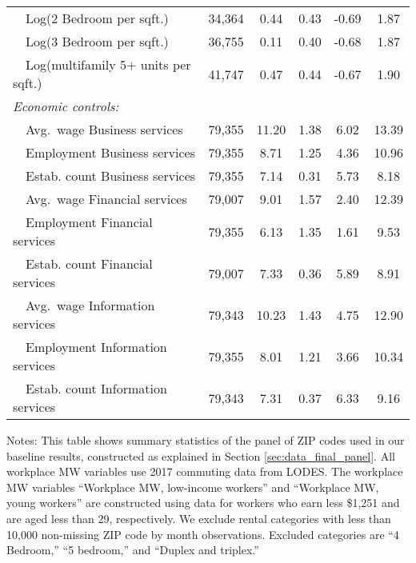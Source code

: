 \begin{table}[hbt!]
\begin{tabular}{@{}lccccc@{}}
        $\quad$Log(2 Bedroom per sqft.)               & 34,364  & 0.44  & 0.43  & -0.69  & 1.87  \\
        $\quad$Log(3 Bedroom per sqft.)               & 36,755  & 0.11  & 0.40  & -0.68  & 1.87  \\
        $\quad$Log(multifamily 5+ units per sqft.)    & 41,747  & 0.47  & 0.44  & -0.67  & 1.90  \\[.3em]
        \textit{Economic controls:}                   &       &       &       &       &       \\
        $\quad$Avg.\ wage Business services           & 79,355  & 11.20  & 1.38  & 6.02  & 13.39  \\
        $\quad$Employment Business services           & 79,355  & 8.71  & 1.25  & 4.36  & 10.96  \\
        $\quad$Estab. count Business services         & 79,355  & 7.14  & 0.31  & 5.73  & 8.18  \\
        $\quad$Avg.\ wage Financial services          & 79,007  & 9.01  & 1.57  & 2.40  & 12.39  \\
        $\quad$Employment Financial services          & 79,355  & 6.13  & 1.35  & 1.61  & 9.53  \\
        $\quad$Estab. count Financial services        & 79,007  & 7.33  & 0.36  & 5.89  & 8.91  \\
        $\quad$Avg.\ wage Information services        & 79,343  & 10.23  & 1.43  & 4.75  & 12.90  \\
        $\quad$Employment Information services        & 79,355  & 8.01  & 1.21  & 3.66  & 10.34  \\
        $\quad$Estab. count Information services      & 79,343  & 7.31  & 0.37  & 6.33  & 9.16  \\ \bottomrule
    \end{tabular}

    \begin{minipage}{.95\textwidth} \footnotesize
        \vspace{2mm}
        Notes: This table shows summary statistics of the panel of ZIP codes 
        used in our baseline results, constructed as explained in Section 
        \ref{sec:data_final_panel}.
        All workplace MW variables use 2017 commuting data from LODES.
        The workplace MW variables ``Workplace MW, low-income workers'' and 
        ``Workplace MW, young workers'' are constructed using data for 
        workers who earn less \$1,251 and are aged less than 29, respectively.
        We exclude rental categories with less than 10,000 non-missing ZIP code 
        by month observations.
        Excluded categories are ``4 Bedroom,'' ``5 bedroom,'' and 
        ``Duplex and triplex.''
    \end{minipage}
\end{table}
